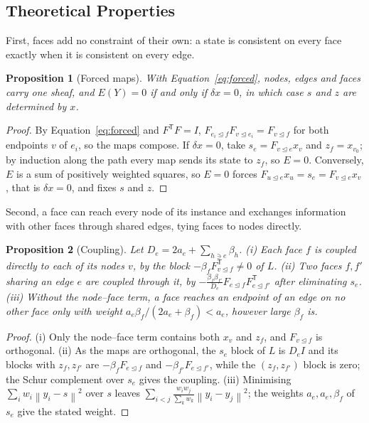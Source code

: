 \documentclass{article}
\newtheorem{proposition}{Proposition}
\newcommand{\norm}[1]{\left\lVert #1\right\rVert}
\newcommand{\transpose}{\mathsf{T}}
\newcommand{\inc}{\trianglelefteq}
\begin{document}
\subsection{Theoretical Properties}
\label{sec:theory}
First, faces add no constraint of their own: a state is consistent on every face exactly when it is consistent on every edge.
\begin{proposition}[Forced maps]\label{prop:forced}
With Equation~\eqref{eq:forced}, nodes, edges and faces carry one sheaf, and $E(Y)=0$ if and only if $\delta x=0$, in which case $s$ and $z$ are determined by $x$.
\end{proposition}
\begin{proof}
By Equation~\eqref{eq:forced} and $F^{\transpose}F=I$, $F_{e_i\inc f}F_{v\inc e_i}=F_{v\inc f}$ for both endpoints $v$ of $e_i$, so the maps compose. If $\delta x=0$, take $s_e=F_{v\inc e}x_v$ and $z_f=x_{v_0}$; by induction along the path every map sends its state to $z_f$, so $E=0$. Conversely, $E$ is a sum of positively weighted squares, so $E=0$ forces $F_{u\inc e}x_u=s_e=F_{v\inc e}x_v$, that is $\delta x=0$, and fixes $s$ and $z$.
\end{proof}

Second, a face can reach every node of its instance and exchanges information with other faces through shared edges, tying faces to nodes directly.
\begin{proposition}[Coupling]\label{prop:reach}
Let $D_e=2a_e+\sum_{h\ni e}\beta_h$. (i) Each face $f$ is coupled directly to each of its nodes $v$, by the block $-\beta_fF_{v\inc f}^{\transpose}\neq0$ of $L$. (ii) Two faces $f,f'$ sharing an edge $e$ are coupled through it, by $-\frac{\beta_f\beta_{f'}}{D_e}F_{e\inc f}F_{e\inc f'}^{\transpose}$ after eliminating $s_e$. (iii) Without the node--face term, a face reaches an endpoint of an edge on no other face only with weight $a_e\beta_f/(2a_e+\beta_f)<a_e$, however large $\beta_f$ is.
\end{proposition}
\begin{proof}
(i) Only the node--face term contains both $x_v$ and $z_f$, and $F_{v\inc f}$ is orthogonal. (ii) As the maps are orthogonal, the $s_e$ block of $L$ is $D_eI$ and its blocks with $z_f,z_{f'}$ are $-\beta_fF_{e\inc f}$ and $-\beta_{f'}F_{e\inc f'}$, while the $(z_f,z_{f'})$ block is zero; the Schur complement over $s_e$ gives the coupling. (iii) Minimising $\sum_iw_i\norm{y_i-s}^2$ over $s$ leaves $\sum_{i<j}\frac{w_iw_j}{\sum_kw_k}\norm{y_i-y_j}^2$; the weights $a_e,a_e,\beta_f$ of $s_e$ give the stated weight.
\end{proof}
\end{document}
